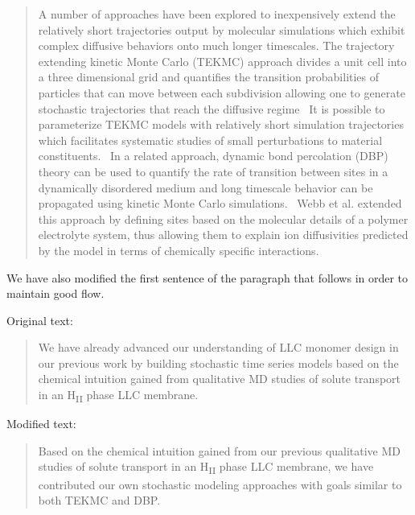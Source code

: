 \documentclass{article}
\begin{document}
\begin{enumerate}[label={Comment \theenumi :}, leftmargin=3.9\parindent]
    \begin{quote}
    A number of approaches have been explored to inexpensively extend the relatively short
    trajectories output by molecular simulations which exhibit complex diffusive behaviors
    onto much longer timescales. The trajectory extending kinetic Monte Carlo (TEKMC) approach
    divides a unit cell into a three dimensional grid and quantifies the transition 
    probabilities of particles that can move between each subdivision allowing one to generate
    stochastic trajectories that reach the diffusive regime~\cite{neyertz_trajectory-extending_2010}
    It is possible to parameterize TEKMC models with relatively short simulation trajectories 
    which facilitates systematic studies of small perturbations to material constituents.~\cite{hanson_computer_2012}
    In a related approach, dynamic bond percolation (DBP) theory can be used to quantify the
    rate of transition between sites in a dynamically disordered medium and long timescale
    behavior can be propagated using kinetic Monte Carlo simulations.~\cite{druger_dynamic_1983}
    Webb et al. extended this approach by defining sites based on the molecular details of 
    a polymer electrolyte system, thus allowing them to explain ion diffusivities predicted by
    the model in terms of chemically specific interactions.~\cite{webb_chemically_2015}
    \end{quote} 
    
    We have also modified the first sentence of the paragraph that follows in order to maintain
    good flow.
    
    Original text:
    \begin{quote}
    We have already advanced our understanding of LLC monomer design in our previous work
    by building stochastic time series models based on the chemical intuition gained
    from qualitative MD studies of solute transport in an H\textsubscript{II} phase LLC
    membrane.
    \end{quote}
    
    Modified text:
    \begin{quote}
    Based on the chemical intuition gained from our previous qualitative MD studies of 
    solute transport in an H\textsubscript{II} phase LLC membrane, we have contributed our
    own stochastic modeling approaches with goals similar to both TEKMC and DBP.
    \end{quote}


\end{enumerate}
\end{document}

